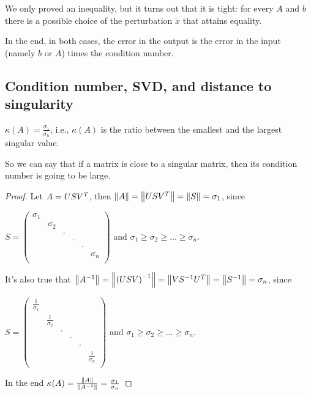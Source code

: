 \documentclass[computational_mathematics.tex]{subfiles}
\begin{document}
We only proved an inequality, but it turns out that it is tight: for every $A$ and $b$ there is a possible choice of the perturbation $\tilde{x}$ that attains equality.

In the end, in both cases, the error in the output is the error in the input (namely $b$ or $A$) times the condition number.

\subsection{Condition number, SVD, and distance to singularity}

\begin{proposition}
$\kappa(A) = \frac{\sigma_1}{\sigma_n}$, i.e., $\kappa(A)$ is the ratio between the smallest and the largest singular value.
\end{proposition}

So we can say that if a matrix is close to a singular matrix, then its condition number is going to be large.

\begin{proof}
Let $A = US{V}^{T}$, then $\left\lVert A\right\rVert = \left\lVert U S {V}^{T}\right\rVert = \left\lVert S\right\rVert = \sigma_1$, since 

$S =  \begin{pmatrix}
    \sigma_1 &&&&&\\
    & \sigma_2&&&&\\
    && \cdot&&&\\
    &&& \cdot&&\\
    &&&& \cdot&\\
    &&&&& \sigma_n\\
  \end{pmatrix}$ and $\sigma_1 \ge \sigma_2 \ge \ldots \ge \sigma_n$. 

  It's also true that $\left\lVert{A}^{-1}\right\rVert = \left\lVert{(USV)}^{-1}\right\rVert = \left\lVert V{S}^{-1} {U}^{T}\right\rVert = \left\lVert{S}^{-1}\right\rVert = \sigma_n$, since 

$S =  \begin{pmatrix}
  \frac{1}{\sigma_1} &&&&&\\
    & \frac{1}{\sigma_2}&&&&\\
    && \cdot&&&\\
    &&& \cdot&&\\
    &&&& \cdot&\\
    &&&&& \frac{1}{\sigma_n}\\
  \end{pmatrix}$ and $\sigma_1 \ge \sigma_2 \ge \ldots \ge \sigma_n$. 

In the end $\kappa(A) = \frac{\left\lVert A\right\rVert}{\left\lVert{A}^{-1}\right\rVert} = \frac{\sigma_1}{\sigma_n}$
\end{proof}
\end{document}
